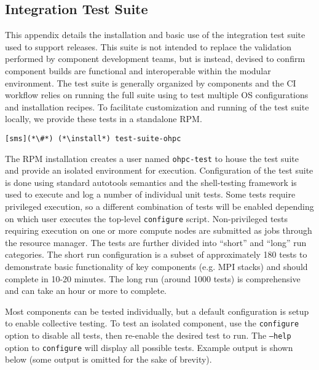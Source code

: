 \subsection{Integration Test Suite}  \label{appendix:test_suite}

This appendix details the installation and basic use of the integration test
suite used to support \OHPC{} releases. This suite is not intended to replace
the validation performed by component development teams, but is instead,
devised to confirm component builds are functional and interoperable within
the modular \OHPC{} environment.
The test suite is generally organized by components and the \OHPC{} CI workflow
relies on running the full suite using \href{https://jenkins.io}{\color{blue}{Jenkins}} to test
multiple OS configurations and installation recipes.
To facilitate customization and running of the test suite locally, we 
provide these tests in a standalone RPM. 

\begin{lstlisting}
[sms](*\#*) (*\install*) test-suite-ohpc
\end{lstlisting}

The RPM installation creates a user named \texttt{ohpc-test} to house the test
suite and provide an isolated environment for execution.  Configuration of the
test suite is done using standard \GNU{} autotools semantics and the
\href{https://jenkins.io}{\color{blue}{BATS}} shell-testing framework is used
to execute and log a number of individual unit tests.  Some tests require
privileged execution, so a different combination of tests will be enabled
depending on which user executes the top-level \texttt{configure}
script. Non-privileged tests requiring execution on one or more compute nodes are
submitted as jobs through the \rms{} resource manager. The tests are further
divided into ``short'' and ``long'' run categories. The short run configuration
is a subset
of approximately 180 tests to demonstrate basic functionality of key components
(e.g. MPI stacks) and should complete in 10-20 minutes. The long run (around
1000 tests) is comprehensive and can take an hour or more to complete.

Most components can be tested individually, but a default configuration is
setup to enable collective testing. To test an isolated component, use the
\texttt{configure} option to disable all tests, then re-enable the desired test
to run. The \texttt{--help} option to \texttt{configure} will display all
possible tests. Example output is shown below (some output is omitted for the
sake of brevity).

